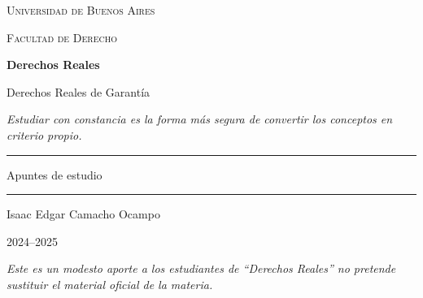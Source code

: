 \documentclass[12pt,oneside]{book}
\newcommand{\universidad}{Universidad de Buenos Aires}
\newcommand{\facultad}{Facultad de Derecho}
\newcommand{\materia}{Derechos Reales}
\newcommand{\titulo}{Derechos Reales de Garant\'ia}
\newcommand{\autor}{Isaac Edgar Camacho Ocampo}
\newcommand{\anio}{2024--2025}
\begin{document}
\begin{titlepage}

\thispagestyle{empty}

\begin{center}

\vspace*{1cm}

{\large \textsc{\universidad}}

\vspace{0.2cm}

{\large \textsc{\facultad}}

\vspace{3cm}

{\Huge \textbf{\materia}}

\vspace{1cm}

{\LARGE \titulo}

\vspace{0.8cm}

\textit{Estudiar con constancia es la forma más segura de convertir los conceptos en criterio propio.}

\vspace{1.2cm}

\rule{0.70\textwidth}{0.5pt}

\vspace{0.5cm}

{\large Apuntes de estudio}

\vspace{0.5cm}

\rule{0.70\textwidth}{0.5pt}

\vfill

{\large \autor}

\vspace{0.3cm}

{\large \anio}

\end{center}

\vfill

\begin{flushleft}
\textit{Este es un modesto aporte a los estudiantes de ``Derechos Reales'' no pretende sustituir el material oficial de la materia.}
\end{flushleft}

\end{titlepage}

\tableofcontents
\clearpage
\end{document}
